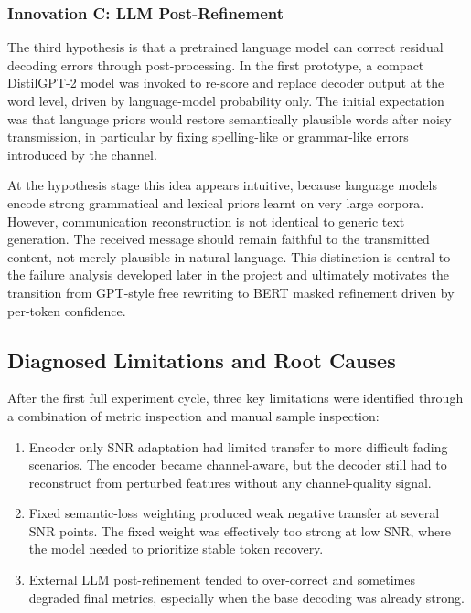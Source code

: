 \subsubsection{Innovation C: LLM Post-Refinement}

The third hypothesis is that a pretrained language model can correct residual decoding errors through post-processing. In the first prototype, a compact DistilGPT-2 \cite{sanh2019distilbert} model was invoked to re-score and replace decoder output at the word level, driven by language-model probability only. The initial expectation was that language priors would restore semantically plausible words after noisy transmission, in particular by fixing spelling-like or grammar-like errors introduced by the channel.

At the hypothesis stage this idea appears intuitive, because language models encode strong grammatical and lexical priors learnt on very large corpora. However, communication reconstruction is not identical to generic text generation. The received message should remain faithful to the transmitted content, not merely plausible in natural language. This distinction is central to the failure analysis developed later in the project and ultimately motivates the transition from GPT-style free rewriting to BERT masked refinement driven by per-token confidence.

\subsection{Diagnosed Limitations and Root Causes}

After the first full experiment cycle, three key limitations were identified through a combination of metric inspection and manual sample inspection:
\begin{enumerate}
    \item Encoder-only SNR adaptation had limited transfer to more difficult fading scenarios. The encoder became channel-aware, but the decoder still had to reconstruct from perturbed features without any channel-quality signal.
    \item Fixed semantic-loss weighting produced weak negative transfer at several SNR points. The fixed weight was effectively too strong at low SNR, where the model needed to prioritize stable token recovery.
    \item External LLM post-refinement tended to over-correct and sometimes degraded final metrics, especially when the base decoding was already strong.
\end{enumerate}


